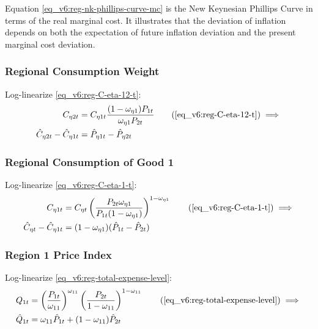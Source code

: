 \documentclass[../thesis.tex]{subfiles}
\begin{document}
Equation \ref{eq_v6:reg-nk-phillips-curve-mc} is the New Keynesian Phillips Curve in terms of the real marginal cost. It illustrates that the deviation of inflation depends on both the expectation of future inflation deviation and the present marginal cost deviation.


\subsubsection*{Regional Consumption Weight}

Log-linearize \ref{eq_v6:reg-C-eta-12-t}:
\begin{align}
	C_{\eta 2 t} &= C_{\eta 1 t} \frac{(1 - \omega_{\eta 1}) P_{1t}}{\omega_{\eta 1} P_{2t}} \tag{\ref{eq_v6:reg-C-eta-12-t}} \implies \\
	\hat{C}_{\eta 2t} - \hat{C}_{\eta 1t} &= \hat{P}_{\eta 1t} - \hat{P}_{\eta 2t} \label{eq_v6:reg-C-eta-12-t-ll}
\end{align}

\subsubsection*{Regional Consumption of Good 1}

Log-linearize \ref{eq_v6:reg-C-eta-1-t}:
\begin{align}
	C_{\eta 1 t} &= C_{\eta t} \left( \frac{P_{2t} \omega_{\eta 1}}{P_{1t} (1 - \omega_{\eta 1})} \right)^{1-\omega_{\eta 1}} \tag{\ref{eq_v6:reg-C-eta-1-t}} \implies \\
	\hat{C}_{\eta t} - \hat{C}_{\eta 1 t} &= (1 - \omega_{\eta 1}) (\hat{P}_{1t} - \hat{P}_{2t}) \label{eq_v6:reg-C-eta-1-t-ll}
\end{align}

\subsubsection*{Region 1 Price Index}

Log-linearize \ref{eq_v6:reg-total-expense-level}:
\begin{align}
	Q_{1t} &= \left( \frac{P_{1 t}}{\omega_{11}} \right)^{\omega_{11}} \left( \frac{P_{2 t}}{1 -\omega_{11}} \right)^{1 -\omega_{11}} \tag{\ref{eq_v6:reg-total-expense-level}} \implies \\
	\hat{Q}_{1t} &= \omega_{11} \hat{P}_{1 t} + (1 -\omega_{11}) \hat{P}_{2 t} \label{eq_v6:reg-total-expense-level-ll}
\end{align}
\end{document}
